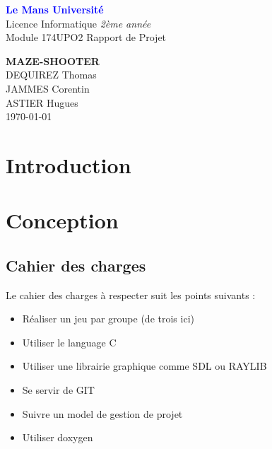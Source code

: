 \documentclass[a4paper,11pt]{article}
\begin{document}
\begin{titlepage}
    \noindent
    \hfill
   \begin{center}
        \vspace{0.7cm}
        \huge \textbf{\textcolor{blue}{Le Mans Université}} \\ Licence Informatique \textit{2ème année} \\ Module 174UPO2 Rapport de Projet
    \end{center}
    \begin{center}
        \Huge \textbf{MAZE-SHOOTER} \\
        \vspace{0.7cm}
        \Large DEQUIREZ Thomas \\ JAMMES Corentin \\ ASTIER Hugues\\
        \vspace{0.7cm}
        \large \today
    \end{center}

\end{titlepage}



\tableofcontents 

\newpage

\section{Introduction}

\section{Conception}

\subsection{Cahier des charges}
Le cahier des charges à respecter suit les points suivants : 
\begin{itemize}
    \item Réaliser un jeu par groupe (de trois ici)
    \item Utiliser le language C
    \item Utiliser une librairie graphique comme SDL ou RAYLIB
    \item Se servir de GIT 
    \item Suivre un model de gestion de projet 
    \item Utiliser doxygen
\end{itemize} 
\end{document}
